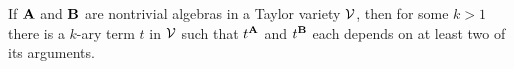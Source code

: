 \begin{lemma}
  \label{lem:nonconstant-terms-exist}
  If $\mathbf{A}$ and $\mathbf{B}$ are nontrivial algebras in a Taylor variety $\mathcal{V}$, then for
  some $k>1$ there is a $k$-ary term $t$ in $\mathcal{V}$ such that $t^{\mathbf{A}}$ and
  $t^{\mathbf{B}}$ each depends on at least two of its arguments.
\end{lemma}
